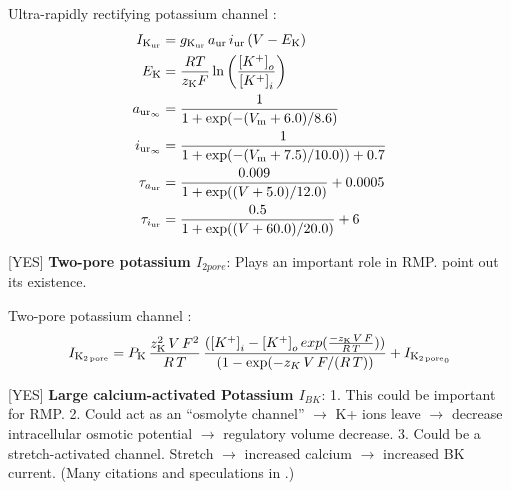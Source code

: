 
Ultra-rapidly rectifying potassium channel \citep{Maleckaretal2009}:
\begin{equation}
  \begin{split}
    I_{\rm K_{\rm ur}} & = g_{\rm K_{\rm ur}}\, a_{\rm ur}\, i_{\rm
      ur}\, (V - E_{\rm K})\\
    E_{\rm K} & =  \frac{R T}{z_{\rm K} F}
    \ln\left(\frac{\left[K^{+}\right]_{o}}
      {\left[K^{+}\right]_{i}}\right)\\
    a_{{\rm ur}_{\infty}} & = \frac{1}{1 + \exp(-(V_{\rm m} +
      6.0)/8.6)}\\
    i_{{\rm ur}_{\infty}} & = \frac{1}{1 + \exp(-(V_{\rm m} +
      7.5)/10.0)) + 0.7}\\
    \tau_{a_{\rm ur}} & = \frac{0.009}{1 + \exp((V + 5.0)/12.0)} +
    0.0005\\
    \tau_{i_{\rm ur}} & = \frac{0.5}{1 + \exp((V +60.0)/20.0)} +
    6\\
  \end{split}
\end{equation}

[YES] {\bf Two-pore potassium $I_{2 pore}$}: Plays an important role
in RMP. \citep{Clarketal2011} point out its existence.

Two-pore potassium channel \citep{UNKNOWN}:
\begin{equation}
 I_{\rm K_{2\, pore}} = P_{\rm K}\, \frac{z_{\rm K}^2\, V\, F^{2}}{R\,
   T}\, \frac{({\left[K^{+}\right]_{i}} - {\left[K^{+}\right]_{o}}\,
 exp(\frac{-z_{\rm K}\, V\, F}{R\, T}))}{(1 - \exp(-z_K\, V\, F/(R\,
 T))} + I_{{\rm K_{2\, pore}}_0}
\end{equation}

[YES] {\bf Large calcium-activated Potassium $I_{BK}$}: 1. This could
be important for RMP. 2. Could act as an ``osmolyte channel''
$\rightarrow$ K+ ions leave $\rightarrow$ decrease intracellular
osmotic potential $\rightarrow$ regulatory volume decrease. 3. Could
be a stretch-activated channel. Stretch $\rightarrow$ increased
calcium $\rightarrow$ increased BK current. (Many citations and
speculations in \citet{BarrettJolleyetal2010}.)


